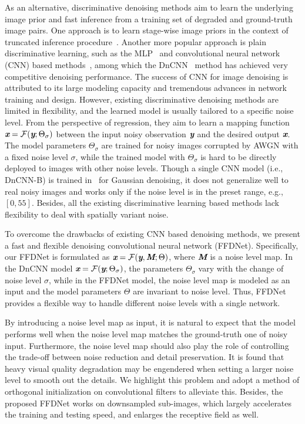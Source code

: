 \documentclass[journal]{IEEEtran}
\begin{document}
As an alternative, discriminative denoising methods aim to learn the underlying image prior and fast inference from a training set of degraded and ground-truth image pairs. One approach is to learn stage-wise image priors in the context of truncated inference procedure~\cite{chen2015trainable}.
Another more popular approach is plain discriminative learning, such as the MLP~\cite{burger2012image} and convolutional neural network (CNN) based methods~\cite{jain2009natural,zhang2017beyond}, among which the DnCNN~\cite{zhang2017beyond} method has achieved very competitive denoising performance. The success of CNN for image denoising is attributed to its large modeling capacity and tremendous advances in network training and design.
However, existing discriminative denoising methods are limited in flexibility, and the learned model is usually tailored to a specific noise level. From the perspective of regression, they aim to learn a mapping function
$\emph{\textbf{x}}=\mathcal{F}(\emph{\textbf{y}};\Theta_{\sigma})$ between the input noisy observation $\emph{\textbf{y}}$ and the desired output $\emph{\textbf{x}}$. The model parameters $\Theta_{\sigma}$ are trained for noisy images corrupted by AWGN with a fixed noise level $\sigma$, while the trained model with $\Theta_{\sigma}$ is hard to be directly deployed to images with other noise levels. Though a single CNN model (i.e., DnCNN-B) is trained in~\cite{zhang2017beyond} for Gaussian denoising, it does not generalize well to real noisy images and works only if the noise level is in the preset range, e.g., $[0, 55]$. Besides, all the existing discriminative learning based methods lack flexibility to deal with spatially variant noise.


To overcome the drawbacks of existing CNN based denoising methods, we present a fast and flexible denoising convolutional neural network (FFDNet). Specifically, our FFDNet is formulated as $\emph{\textbf{x}}=\mathcal{F}(\emph{\textbf{y}}, \emph{\textbf{M}};\Theta)$, where $\emph{\textbf{M}}$ is a noise level map. In the DnCNN model $\emph{\textbf{x}}=\mathcal{F}(\emph{\textbf{y}};\Theta_{\sigma})$, the parameters $\Theta_{\sigma}$ vary with the change of noise level $\sigma$, while in the FFDNet model, the noise level map is modeled as an input and the model parameters $\Theta$ are invariant to noise level. Thus, FFDNet provides a flexible way to handle different noise levels with a single network.


By introducing a noise level map as input, it is natural to expect that the model performs well when the noise level map matches the ground-truth one of noisy input.
Furthermore, the noise level map should also play the role of controlling the trade-off between noise reduction and detail preservation.
It is found that heavy visual quality degradation may be engendered when setting a larger noise level to smooth out the details.
We highlight this problem and adopt a method of orthogonal initialization on convolutional filters to alleviate this.
Besides, the proposed FFDNet works on downsampled sub-images, which largely accelerates the training and testing speed, and enlarges the receptive field as well.
\end{document}
